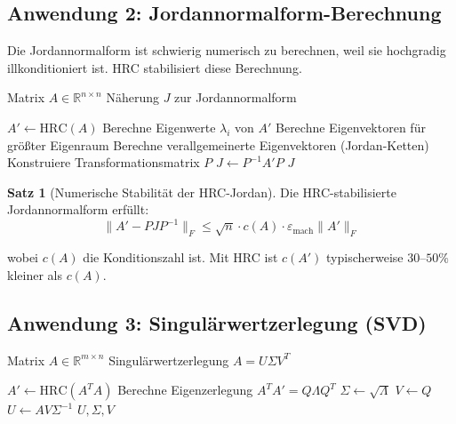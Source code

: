 \documentclass[a4paper,12pt]{article}
\theoremstyle{definition}
\newtheorem{satz}{Satz}
\begin{document}
\subsection{Anwendung 2: Jordannormalform-Berechnung}

Die Jordannormalform ist schwierig numerisch zu berechnen, weil sie hochgradig illkonditioniert ist. HRC stabilisiert diese Berechnung.

\begin{algorithm}[H]
\caption{HRC-stabilisierte Jordannormalform (HRC-Jordan)}
\begin{algorithmic}[1]
\Require Matrix $A \in \mathbb{R}^{n \times n}$
\Ensure Näherung $J$ zur Jordannormalform

\State $A' \gets \text{HRC}(A)$ 
\State Berechne Eigenwerte $\lambda_i$ von $A'$ 
\State Berechne Eigenvektoren für größter Eigenraum
\State Berechne verallgemeinerte Eigenvektoren (Jordan-Ketten)
\State Konstruiere Transformationsmatrix $P$
\State $J \gets P^{-1} A' P$
\State \Return $J$
\end{algorithmic}
\end{algorithm}

\begin{satz}[Numerische Stabilität der HRC-Jordan]
Die HRC-stabilisierte Jordannormalform erfüllt:
\[
\|A' - P J P^{-1}\|_F \leq \sqrt{n} \cdot c(A) \cdot \varepsilon_{\text{mach}} \|A'\|_F
\]

wobei $c(A)$ die Konditionszahl ist. Mit HRC ist $c(A')$ typischerweise $30$--$50\%$ kleiner als $c(A)$.
\end{satz}

\subsection{Anwendung 3: Singulärwertzerlegung (SVD)}

\begin{algorithm}[H]
\caption{HRC-vorkonditionierte SVD}
\begin{algorithmic}[1]
\Require Matrix $A \in \mathbb{R}^{m \times n}$
\Ensure Singulärwertzerlegung $A = U \Sigma V^T$

\State $A' \gets \text{HRC}(A^T A)$ 
\State Berechne Eigenzerlegung $A^T A' = Q \Lambda Q^T$
\State $\Sigma \gets \sqrt{\Lambda}$ 
\State $V \gets Q$ 
\State $U \gets A V \Sigma^{-1}$ 
\State \Return $U, \Sigma, V$
\end{algorithmic}
\end{algorithm}
\end{document}
